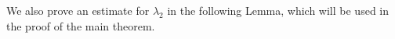 \documentclass[11pt]{article}
\theoremstyle{definition}
\begin{document}



 
We also prove an estimate for $\lambda_2$ in the following Lemma, which will be used in the proof of the main theorem.
\end{document}
